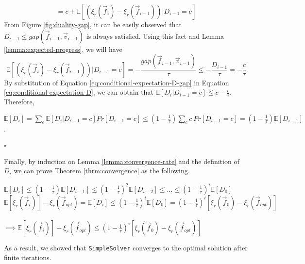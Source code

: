 \begin{equation}
    \label{eq:conditional-expectation-D}
    = c + \mathds{E}[(\xi_r(\overrightarrow{f}_i) - \xi_r(\overrightarrow{f}_{i-1}))|D_{i-1}=c]
\end{equation}
From Figure \ref{fig:duality-gap}, it can be easily observed that $D_{i-1} \leq gap(\overrightarrow{f}_{i-1},\overrightarrow{v}_{i-1})$ is always satisfied. Using this fact and Lemma \ref{lemma:expected-progress}, we will have
\begin{equation}
    \label{eq:conditional-expectation-D-gap}
    \mathds{E}[(\xi_r(\overrightarrow{f}_i) - \xi_r(\overrightarrow{f}_{i-1}))|D_{i-1}=c]=-\frac{gap(\overrightarrow{f}_{i-1}, \overrightarrow{v}_{i-1})}{\tau} \leq -\frac{D_{i-1}}{\tau}=-\frac{c}{\tau}
\end{equation}
By substitution of Equation \ref{eq:conditional-expectation-D-gap} in Equation \ref{eq:conditional-expectation-D}, we can obtain that $\mathds{E}[D_i|D_{i-1}=c] \leq c -\frac{c}{\tau}$. Therefore, 
\begin{center}
    $\mathds{E}[D_i]=\sum_{e} \mathds{E}[D_i|D_{i-1}=c]Pr[D_{i-1}=c] \leq (1-\frac{1}{\tau})\sum_{e} c~Pr[D_{i-1}=c]=(1-\frac{1}{\tau})\mathds{E}[D_{i-1}]$.
\end{center}
\begin{flushright}
    $\square$
\end{flushright}
Finally, by induction on Lemma \ref{lemma:convergence-rate} and the definition of $D_i$ we can prove Theorem \ref{thrm:convergence} as the following.
\begin{center}
    $\mathds{E}[D_i] \leq (1-\frac{1}{\tau}) \mathds{E}[D_{i-1}] \leq (1-\frac{1}{\tau})^2 \mathds{E}[D_{i-2}] \leq \dots \leq (1-\frac{1}{\tau})^i \mathds{E}[D_{0}]$\\
    $\mathds{E}[\xi_r(\overrightarrow{f}_i)] - \xi_r(\overrightarrow{f}_{opt})=\mathds{E}[D_i] \leq (1-\frac{1}{\tau})^i \mathds{E}[D_{0}]=(1-\frac{1}{\tau})^i [\xi_r(\overrightarrow{f}_{0}) - \xi_r(\overrightarrow{f}_{opt})]$\\
    ~\\
    $\implies \mathds{E}[\xi_r(\overrightarrow{f}_i)] - \xi_r(\overrightarrow{f}_{opt}) \leq (1-\frac{1}{\tau})^i [\xi_r(\overrightarrow{f}_{0}) - \xi_r(\overrightarrow{f}_{opt})]$
\end{center}
As a result, we showed that \texttt{SimpleSolver} converges to the optimal solution after finite iterations.